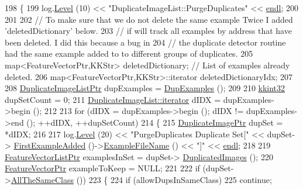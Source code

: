 \begin{DoxyCode}
198 \{
199   log.\hyperlink{class_k_k_b_1_1_run_log_a32cf761d7f2e747465fd80533fdbb659}{Level} (10) << \textcolor{stringliteral}{"DuplicateImageList::PurgeDuplicates"} << \hyperlink{namespace_k_k_b_ad1f50f65af6adc8fa9e6f62d007818a8}{endl};
200 
201   
202   \textcolor{comment}{// To make sure that we do not delete the same example Twice I added 'deletedDictionary' below.}
203   \textcolor{comment}{// if will track all examples by address that have been deleted.  I did this because a bug in}
204   \textcolor{comment}{// the duplicate detector routine had the same example added to to different groups of duplicates.}
205   map<FeatureVectorPtr,KKStr>  deletedDictionary;  \textcolor{comment}{// List of examples already deleted.}
206   map<FeatureVectorPtr,KKStr>::iterator  deletedDictionaryIdx;
207   
208   \hyperlink{class_k_k_m_l_l_1_1_duplicate_image_list}{DuplicateImageListPtr}  dupExamples = \hyperlink{class_k_k_m_l_l_1_1_duplicate_images_a63a339b4fe4a6626d30ca55438b4e24c}{DupExamples} ();
209 
210   \hyperlink{namespace_k_k_b_a8fa4952cc84fda1de4bec1fbdd8d5b1b}{kkint32}  dupSetCount = 0;  
211   \hyperlink{class_k_k_b_1_1_k_k_queue_aa3c2796a726eea468b94132a9fbf2cfe}{DuplicateImageList::iterator}  dIDX = dupExamples->begin ();
212 
213   \textcolor{keywordflow}{for}  (dIDX = dupExamples->begin ();   dIDX != dupExamples->end ();  ++dIDX, ++dupSetCount)
214   \{
215     \hyperlink{class_k_k_m_l_l_1_1_duplicate_image}{DuplicateImagePtr} dupSet = *dIDX;
216 
217     log.\hyperlink{class_k_k_b_1_1_run_log_a32cf761d7f2e747465fd80533fdbb659}{Level} (20) << \textcolor{stringliteral}{"PurgeDuplicates  Duplicate Set["} << dupSet->
      \hyperlink{class_k_k_m_l_l_1_1_duplicate_image_ab005d27fa527c46b5b15fd77945680eb}{FirstExampleAdded} ()->\hyperlink{class_k_k_m_l_l_1_1_feature_vector_ab47c89ab1e9396664fdc0dc34b6e1ab5}{ExampleFileName} () << \textcolor{stringliteral}{"]"} << 
      \hyperlink{namespace_k_k_b_ad1f50f65af6adc8fa9e6f62d007818a8}{endl};
218 
219     \hyperlink{class_k_k_m_l_l_1_1_feature_vector_list}{FeatureVectorListPtr}  examplesInSet = dupSet->
      \hyperlink{class_k_k_m_l_l_1_1_duplicate_image_ac5508ceab803834254df40c3f0d8d345}{DuplicatedImages} ();
220     \hyperlink{class_k_k_m_l_l_1_1_feature_vector}{FeatureVectorPtr} exampleToKeep = NULL;
221 
222     \textcolor{keywordflow}{if}  (dupSet->\hyperlink{class_k_k_m_l_l_1_1_duplicate_image_a0d325032b258151a62ea1b757e2862aa}{AllTheSameClass} ())
223     \{
224       \textcolor{keywordflow}{if}  (allowDupsInSameClass)
225         \textcolor{keywordflow}{continue};

\end{DoxyCode}
